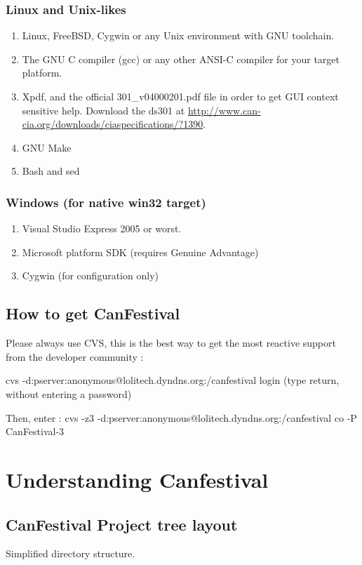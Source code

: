 \documentclass[a4paper,12pt]{book}
\newcommand\liststyleLv{%
\renewcommand\labelitemi{{--}}
\renewcommand\labelitemii{{--}}
\renewcommand\labelitemiii{{--}}
\renewcommand\labelitemiv{{--}}
}
\begin{document}
\subsubsection[\space Linux and Unix{}-likes]{\space Linux and Unix{}-likes}
\liststyleLv
\begin{enumerate}
\item Linux, FreeBSD, Cygwin or any Unix environment with GNU toolchain.
\item The GNU C compiler (gcc) or any other ANSI{}-C compiler for your
target platform.
\item Xpdf, and the official 301\_v04000201.pdf file in order to get GUI
context sensitive help. Download the ds301 at\newline
\href{http://www.can-cia.org/downloads/ciaspecifications/?1390}{http://www.can{}-cia.org/downloads/ciaspecifications/?1390}.
\item GNU Make
\item Bash and sed
\end{enumerate}
\subsubsection{Windows (for native win32 target)}
\liststyleLv
\begin{enumerate}
\item Visual Studio Express 2005 or worst.
\item Microsoft platform SDK (requires Genuine Advantage)
\item Cygwin (for configuration only)
\end{enumerate}
\subsection{How to get CanFestival}
Please always use CVS, this is the best way to get the most reactive
support from the developer community :

cvs {}-d:pserver:anonymous@lolitech.dyndns.org:/canfestival
login\newline
(type return, without entering a password) 

Then, enter : \newline
cvs {}-z3 {}-d:pserver:anonymous@lolitech.dyndns.org:/canfestival co
{}-P CanFestival{}-3

\section{Understanding Canfestival}
\subsection{CanFestival Project tree layout}
Simplified directory structure.
\end{document}
